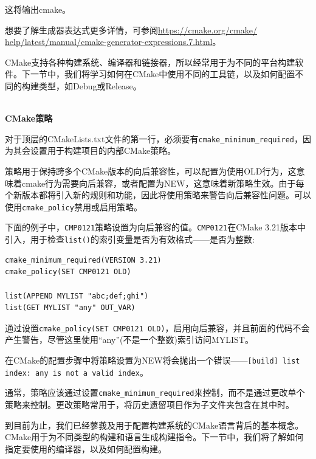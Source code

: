 这将输出cmake。

想要了解生成器表达式更多详情，可参阅\url{https://cmake.org/cmake/
help/latest/manual/cmake-generator-expressions.7.html}。

CMake支持各种构建系统、编译器和链接器，所以经常用于为不同的平台构建软件。下一节中，我们将学习如何在CMake中使用不同的工具链，以及如何配置不同的构建类型，如Debug或Release。

\hspace*{\fill} \\ %
\noindent
\textbf{CMake策略}

对于顶层的CMakeLists.txt文件的第一行，必须要有\texttt{cmake\_minimum\_required}，因为其会设置用于构建项目的内部CMake策略。

策略用于保持跨多个CMake版本的向后兼容性，可以配置为使用OLD行为，这意味着cmake行为需要向后兼容，或者配置为NEW，这意味着新策略生效。由于每个新版本都将引入新的规则和功能，因此将使用策略来警告向后兼容性问题。可以使用\texttt{cmake\_policy}禁用或启用策略。

下面的例子中，\texttt{CMP0121}策略设置为向后兼容的值。\texttt{CMP0121}在CMake 3.21版本中引入，用于检查\texttt{list()}的索引变量是否为有效格式——是否为整数:

\begin{lstlisting}[style=styleCMake]
cmake_minimum_required(VERSION 3.21)
cmake_policy(SET CMP0121 OLD)

list(APPEND MYLIST "abc;def;ghi")
list(GET MYLIST "any" OUT_VAR)
\end{lstlisting}

通过设置\texttt{cmake\_policy(SET CMP0121 OLD)}，启用向后兼容，并且前面的代码不会产生警告，尽管这里使用“any”(不是一个整数)索引访问MYLIST。

在CMake的配置步骤中将策略设置为NEW将会抛出一个错误——\texttt{[build] list index: any is not
	a valid index}。

\begin{tcolorbox}[colback=blue!5!white,colframe=blue!75!black,title=除非包含遗留项目，否则避免设置策略]
通常，策略应该通过设置\texttt{cmake\_minimum\_required}来控制，而不是通过更改单个策略来控制。更改策略常用于，将历史遗留项目作为子文件夹包含在其中时。
\end{tcolorbox}

到目前为止，我们已经蓼莪及用于配置构建系统的CMake语言背后的基本概念。CMake用于为不同类型的构建和语言生成构建指令。下一节中，我们将了解如何指定要使用的编译器，以及如何配置构建。













